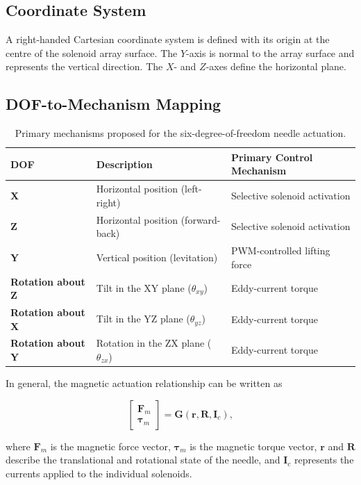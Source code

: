 \documentclass[12pt, a4paper]{article}
\begin{document}
\subsection{Coordinate System}

A right-handed Cartesian coordinate system is defined with its origin at the centre of the solenoid array surface. The $Y$-axis is normal to the array surface and represents the vertical direction. The $X$- and $Z$-axes define the horizontal plane.

\subsection{DOF-to-Mechanism Mapping}

\begin{table}[h]
\centering
\begin{tabular}{>{\bfseries}l l l}
\toprule
DOF & Description & Primary Control Mechanism \\
\midrule
X & Horizontal position (left-right) & Selective solenoid activation \\
Z & Horizontal position (forward-back) & Selective solenoid activation \\
Y & Vertical position (levitation) & PWM-controlled lifting force \\
Rotation about Z & Tilt in the XY plane ($\theta_{xy}$) & Eddy-current torque \\
Rotation about X & Tilt in the YZ plane ($\theta_{yz}$) & Eddy-current torque \\
Rotation about Y & Rotation in the ZX plane ($\theta_{zx}$) & Eddy-current torque \\
\bottomrule
\end{tabular}
\caption{Primary mechanisms proposed for the six-degree-of-freedom needle actuation.}
\end{table}

In general, the magnetic actuation relationship can be written as

\begin{equation}
\begin{bmatrix}
\mathbf{F}_m\\
\boldsymbol{\tau}_m
\end{bmatrix}
=
\mathbf{G}
\left(
\mathbf{r},
\mathbf{R},
\mathbf{I}_c
\right),
\end{equation}

where $\mathbf{F}_m$ is the magnetic force vector, $\boldsymbol{\tau}_m$ is the magnetic torque vector, $\mathbf{r}$ and $\mathbf{R}$ describe the translational and rotational state of the needle, and $\mathbf{I}_c$ represents the currents applied to the individual solenoids.
\end{document}
